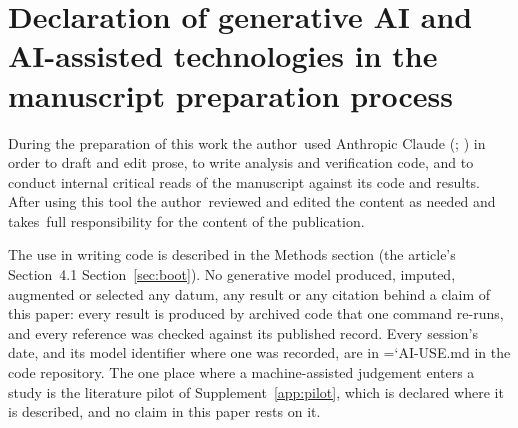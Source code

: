 \documentclass[11pt,3p,review,authoryear]{elsarticle}
\DeclareRobustCommand\texttt[1]{%
  {\ttfamily\hyphenchar\font=`\-\relax #1}}
\theoremstyle{definition}
\newif\ifblind
\newcommand{\titlepagedocument}{}
\begin{document}
\section*{Declaration of generative AI and AI-assisted technologies in the manuscript preparation process}

During the preparation of this work the \ifblind author(s)\else author\fi\
used Anthropic Claude (\aiModelId; \aiModelDate) in order to draft and edit
prose, to write analysis and verification code, and to conduct internal
critical reads of the manuscript against its code and results. After using this tool
the \ifblind author(s)\else author\fi\ reviewed and edited the content as
needed and \ifblind take(s)\else takes\fi\ full responsibility for the
content of the publication.

The use in writing code is described in the Methods section
(\ifdefined\titlepagedocument the article's Section~4.1\else
Section~\ref{sec:boot}\fi). No
generative model produced, imputed, augmented or selected any datum, any
result or any citation behind a claim of this paper: every result is
produced by archived code that one command re-runs, and every reference was
checked against its published record. Every session's date, and its model
identifier where one was recorded, are in \texttt{AI-USE.md} in the code
repository. The one
place where a machine-assisted judgement enters a study is the literature
pilot of Supplement~\ref{app:pilot}, which is declared where it is
described, and no claim in this paper rests on it.
\end{document}
